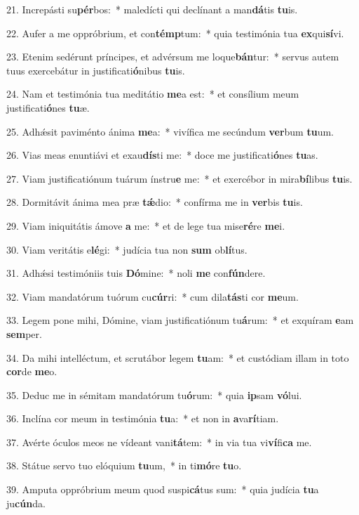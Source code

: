 21. Increpásti su\textbf{pér}bos:~*  maledícti qui declínant a man\textbf{dá}tis \textbf{tu}is.\

22. Aufer a me oppróbrium, et con\textbf{témp}tum:~*  quia testimónia tua \textbf{ex}qui\textbf{sí}vi.\

23. Etenim sedérunt príncipes, et advérsum me loque\textbf{bán}tur:~*  servus autem tuus exercebátur in justificati\textbf{ó}nibus \textbf{tu}is.\

24. Nam et testimónia tua meditátio \textbf{me}a est:~*  et consílium meum justificati\textbf{ó}nes \textbf{tu}æ.\

25. Adhǽsit paviménto ánima \textbf{me}a:~*  vivífica me secúndum \textbf{ver}bum \textbf{tu}um.\

26. Vias meas enuntiávi et exau\textbf{dís}ti me:~*  doce me justificati\textbf{ó}nes \textbf{tu}as.\

27. Viam justificatiónum tuárum ínstru\textbf{e} me:~*  et exercébor in mira\textbf{bí}libus \textbf{tu}is.\

28. Dormitávit ánima mea præ \textbf{tǽ}dio:~*  confírma me in \textbf{ver}bis \textbf{tu}is.\

29. Viam iniquitátis ámove \textbf{a} me:~*  et de lege tua mise\textbf{ré}re \textbf{me}i.\

30. Viam veritátis e\textbf{lé}gi:~*  judícia tua non \textbf{sum} ob\textbf{lí}tus.\

31. Adhǽsi testimóniis tuis \textbf{Dó}mine:~*  noli \textbf{me} con\textbf{fún}dere.\

32. Viam mandatórum tuórum cu\textbf{cúr}ri:~*  cum dila\textbf{tás}ti cor \textbf{me}um.\

33. Legem pone mihi, Dómine, viam justificatiónum tu\textbf{á}rum:~*  et exquíram \textbf{e}am \textbf{sem}per.\

34. Da mihi intelléctum, et scrutábor legem \textbf{tu}am:~*  et custódiam illam in toto \textbf{cor}de \textbf{me}o.\

35. Deduc me in sémitam mandatórum tu\textbf{ó}rum:~*  quia \textbf{ip}sam \textbf{vó}lui.\

36. Inclína cor meum in testimónia \textbf{tu}a:~*  et non in \textbf{a}va\textbf{rí}tiam.\

37. Avérte óculos meos ne vídeant vani\textbf{tá}tem:~*  in via tua vi\textbf{ví}fi\textbf{ca} me.\

38. Státue servo tuo elóquium \textbf{tu}um,~*  in ti\textbf{mó}re \textbf{tu}o.\

39. Amputa oppróbrium meum quod suspi\textbf{cá}tus sum:~*  quia judícia \textbf{tu}a ju\textbf{cún}da.\

